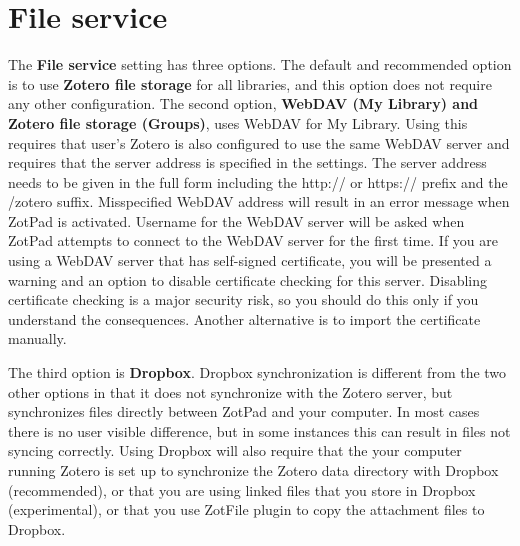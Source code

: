 \documentclass[oneside, openany, 12pt]{tufte-book}
\newcommand{\ipadfootnote}[1]{}
\newcommand{\ipadfootnote}[1]{\footnote{#1}}
\begin{document}
\section{File service}

The \textbf{File service} setting has three options. The default and recommended option is to use \textbf{Zotero file storage} for all libraries, and this option does not require any other configuration. The second option, \textbf{WebDAV (My Library) and Zotero file storage (Groups)}, uses WebDAV for My Library. Using this requires that user's Zotero is also configured to use the same WebDAV server and requires that the server address is specified in the settings. The server address needs to be given in the full form including the http:// or https:// prefix and the /zotero suffix. Misspecified WebDAV address will result in an error message when ZotPad is activated. Username for the WebDAV server will be asked when ZotPad attempts to connect to the WebDAV server for the first time. If you are using a WebDAV server that has self-signed certificate, you will be presented a warning and an option to disable certificate checking for this server. Disabling certificate checking is a major security risk, so you should do this only if you understand the consequences. Another alternative is to import the certificate manually\ipadfootnote{See this page for instructions on how to install SSL certificates on iPad \url{http://stackoverflow.com/questions/4589562/how-to-install-my-servers-self-signed-certificate-on-an-ipad}}.

The third option is \textbf{Dropbox}. Dropbox synchronization is different from the two other options in that it does not synchronize with the Zotero server, but synchronizes files directly between ZotPad and your computer. In most cases there is no user visible difference, but in some instances this can result in files not syncing correctly\ipadfootnote{For example, if a you edit a file on your computer, but do not sync Zotero, ZotPad does not know that a new version of a file would be available in Dropbox because Zotero server is not aware of this change.}. Using Dropbox will also require that the your computer running Zotero is set up to synchronize the Zotero data directory with Dropbox (recommended), or that you are using linked files that you store in Dropbox (experimental), or that you use ZotFile plugin\ipadfootnote{More information about ZotFile can be found on the ZotFile website at \url{http://www.columbia.edu/~jpl2136/zotfile.html}. ZotPad supports all the ZotFile renaming features except collections based renaming.} to copy the attachment files to Dropbox.
\end{document}
